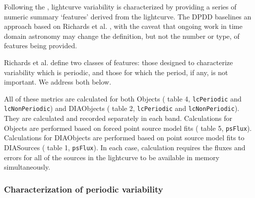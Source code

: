 Following the \DPDD{}, lightcurve variability is characterized by providing a series of numeric summary `features' derived from the lightcurve. The DPDD baselines an approach based on Richards et al. \cite{Richards11}, with the caveat that ongoing work in time domain astronomy may change the definition, but not the number or type, of features being provided.

Richards et al. define two classes of features: those designed to characterize variability which is periodic, and those for which the period, if any, is not important. We address both below.

All of these metrics are calculated for both Objects (\DPDD{} table 4, \texttt{lcPeriodic} and \texttt{lcNonPeriodic}) and DIAObjects (\DPDD{} table 2, \texttt{lcPeriodic} and \texttt{lcNonPeriodic}). They are calculated and recorded separately in each band. Calculations for Objects are performed based on forced point source model fits (\DPDD{} table 5, \texttt{psFlux}).  Calculations for DIAObjects are performed based on point source model fits to DIASources (\DPDD{} table 1, \texttt{psFlux}). In each case, calculation requires the fluxes and errors for all of the sources in the lightcurve to be available in memory simultaneously.

\subsubsection{Characterization of periodic variability}

